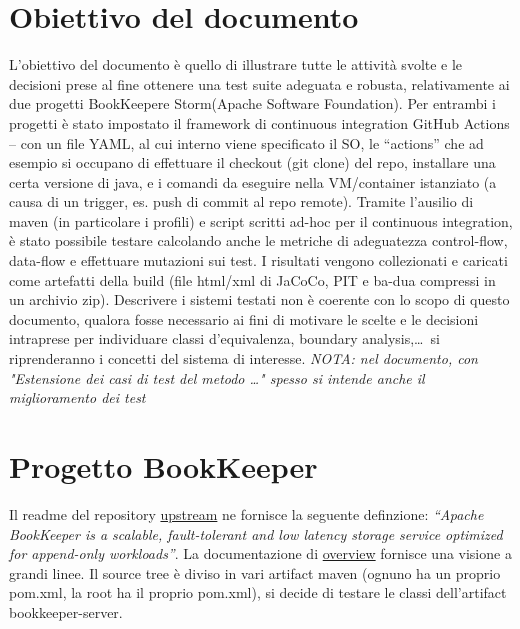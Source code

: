 \documentclass[10pt, a4paper]{article}
\title{\reporttitle}
\author{\authorsname\;(\univcode)}
\date{}
\def\bookkeeper{BookKeeper}
\def\storm{Storm}
\def\asf{Apache Software Foundation}
\begin{document}
	\maketitle
	\thispagestyle{empty}

	\tableofcontents

	\section*{Obiettivo del documento}
	L’obiettivo del documento è quello di illustrare tutte le attività svolte e le decisioni prese al fine ottenere una test suite
	adeguata e robusta, relativamente ai due progetti \bookkeeper e \storm (\asf). 
	Per entrambi i progetti è stato impostato il framework di continuous integration GitHub Actions – con un file YAML, 
	al cui interno viene specificato il SO, le “actions” che ad esempio si occupano di effettuare il checkout (git clone) del repo, 
	installare una certa versione di java, e i comandi da eseguire nella VM/container istanziato (a causa di un trigger, es. push di
	commit al repo remote). 
	Tramite l’ausilio di maven (in particolare i profili) e script scritti ad-hoc per il continuous integration, è stato possibile
	testare calcolando anche le metriche di adeguatezza control-flow, data-flow e effettuare mutazioni sui test. 
	I risultati vengono collezionati e caricati come artefatti della build
	(file html/xml di JaCoCo, PIT e ba-dua compressi in un archivio zip).
	Descrivere i sistemi testati non è coerente con lo scopo di questo documento, qualora fosse necessario ai fini 
	di motivare le scelte e le decisioni intraprese per individuare classi d’equivalenza, boundary analysis,\dots\,
	si riprenderanno i concetti del sistema di interesse. \textit{NOTA: nel documento, con "Estensione dei
	casi di test del metodo \dots " spesso si intende anche il miglioramento dei test}

	\pagebreak

	\section{Progetto \bookkeeper}
	Il readme del repository \href{https://github.com/apache/bookkeeper}{upstream} ne fornisce 
	la seguente definzione: \textit{“Apache BookKeeper is a scalable, 
	fault-tolerant and low latency storage service optimized for append-only workloads”}. 
	La documentazione di \href{https://bookkeeper.apache.org/archives/docs/master/bookkeeperOverview.html}{overview}
	fornisce una visione a grandi linee.
	Il source tree è diviso in vari artifact maven (ognuno ha un proprio pom.xml, la root ha il proprio pom.xml), 
	si decide di testare le classi dell'artifact bookkeeper-server. \\
	
\end{document}
